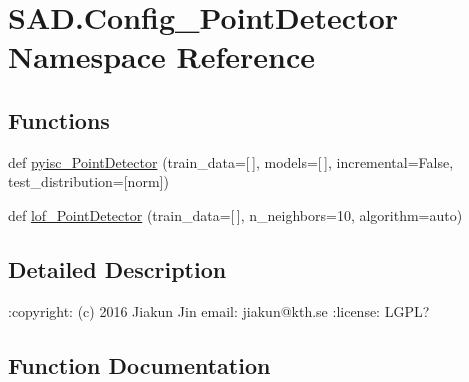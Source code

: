 \hypertarget{namespaceSAD_1_1Config__PointDetector}{}\section{S\+A\+D.\+Config\+\_\+\+Point\+Detector Namespace Reference}
\label{namespaceSAD_1_1Config__PointDetector}
\subsection*{Functions}
\begin{DoxyCompactItemize}
\item 
def \hyperlink{namespaceSAD_1_1Config__PointDetector_a4a47fd76139083b7d9f41d3997edf3f0}{pyisc\+\_\+\+Point\+Detector} (train\+\_\+data=\mbox{[}$\,$\mbox{]}, models=\mbox{[}$\,$\mbox{]}, incremental=False, test\+\_\+distribution=\mbox{[}\textquotesingle{}norm\textquotesingle{}\mbox{]})
\item 
def \hyperlink{namespaceSAD_1_1Config__PointDetector_a420441441318e4c5c12031e2e19dce98}{lof\+\_\+\+Point\+Detector} (train\+\_\+data=\mbox{[}$\,$\mbox{]}, n\+\_\+neighbors=10, algorithm=\textquotesingle{}auto\textquotesingle{})
\end{DoxyCompactItemize}


\subsection{Detailed Description}
\begin{DoxyVerb}:copyright: (c) 2016 Jiakun Jin
email: jiakun@kth.se
:license: LGPL?
\end{DoxyVerb}
 

\subsection{Function Documentation}
